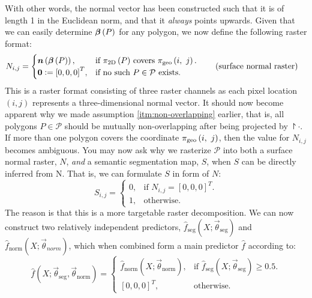 With other words, the normal vector has been constructed such that it is of length 1 in the Euclidean norm, and that it \emph{always} points upwards.
\noindent
Given that we can easily determine $\boldsymbol{\beta}\left(P\right)$ for any polygon, we now define the following raster format:
\begin{align*}
  N_{i,j} &= \begin{cases}
    \normalplanar{P}, &\text{if $\project{P}$ covers } \pixtogeo{i}{j}.\\
    \vec{0} \defeq {[0, 0, 0]}^T, &\text{if no such } P \in \mathcal{P} \text{ exists.}
  \end{cases}
  \tag{surface normal raster}%
  \label{eq:surface-normal-raster}
\end{align*}
This is a raster format consisting of three raster channels as each pixel location $(i, j)$ represents a three-dimensional normal vector.
It should now become apparent why we made assumption \ref{itm:non-overlapping} earlier, that is, all polygons $P \in \mathcal{P}$ should be mutually non-overlapping after being projected by $\project{\cdot}$.
If more than one polygon covers the coordinate $\pi_{\mathrm{geo}}\left(i,~j\right)$, then the value for $N_{i,j}$ becomes ambiguous.
You may now ask why we rasterize $\mathcal{P}$ into both a surface normal raster, $N$, \emph{and} a semantic segmentation map, $S$, when $S$ can be directly inferred from N.
That is, we can formulate $S$ in form of $N$:
\begin{equation*}
  S_{i, j}
  =
  \begin{cases}
    0, &\text{if } N_{i,j} = {\left[0, 0, 0\right]}^T.  \\
    1, &\text{otherwise.}
  \end{cases}
\end{equation*}
The reason is that this is a more targetable raster decomposition.
We can now construct two relatively independent predictors, $\hat{f}_{\mathrm{seg}}(X; \vec{\theta}_{\mathrm{seg}})$ and $\hat{f}_{\mathrm{norm}}(X; \vec{\theta}_{norm})$, which when combined form a main predictor $\hat{f}$ according to:
\begin{equation*}
  \hat{f}\left(X; \vec{\theta}_{\mathrm{seg}}, \vec{\theta}_{\mathrm{norm}}\right)
  =
  \begin{cases}
    \hat{f}_{\mathrm{norm}}\left(X; \vec{\theta}_{\mathrm{norm}}\right), &\text{if } \hat{f}_{\mathrm{seg}}\left(X; \vec{\theta}_{\mathrm{seg}}\right) \geq 0.5. \\
    {\left[0, 0, 0\right]}^T, &\text{otherwise.}
  \end{cases}
\end{equation*}
